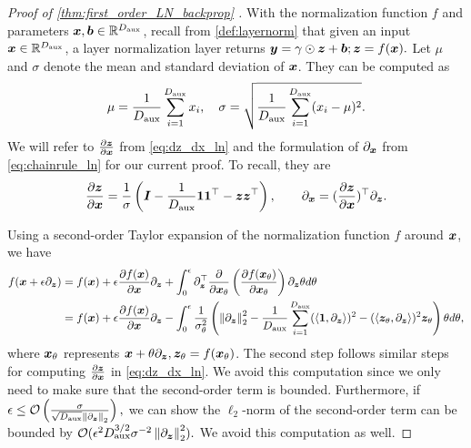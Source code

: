 \begin{proof}[ Proof of \cref{thm:first_order_LN_backprop} ]
With the normalization function $f$ and parameters ${\bm{x}}, {\bm{b}} \in \mathbb{R}^{ D_{\text{aux}}}$, recall from \cref{def:layernorm} that given an input ${\bm{x}} \in \mathbb{R}^{ D_{\text{aux}} }$, a layer normalization layer returns ${\bm{y}} = \gamma \odot {\bm{z}} + {\bm{b}}; {\bm{z}} = f({\bm{x}}).$  Let $\mu$ and $\sigma$ denote the mean and standard deviation of ${\bm{x}}$. They can be computed as 
\begin{align*}
    \mu = \frac{1}{ D_{\text{aux}} } \sum_{i=1}^{D_{\text{aux}}} x_i, \quad \sigma = \sqrt{ \frac{ 1 }{ D_{\text{aux}} } \sum_{i=1}^{D_{\text{aux}}} (x_i - \mu)^2  }.
\end{align*}
We will refer to $\frac{\partial {\bm{z}}}{\partial {\bm{x}}}$ from \cref{eq:dz_dx_ln} and the formulation of $\partial_{{\bm{x}}}$ from \cref{eq:chainrule_ln} for our current proof. To recall, they are
\begin{align*}
    \frac{\partial {\bm{z}}}{ \partial {\bm{x}}} =
     \frac{1}{\sigma} \left( {\bm{I}} - \frac{ 1 }{ D_{\text{aux}} } \mathbf{1} \mathbf{1}^{\top} - {\bm{z}} {\bm{z}}^{\top} \right), \qquad \partial_{{\bm{x}}} = (\frac{\partial {\bm{z}}}{ \partial {\bm{x}}})^{\top} \partial_{ {\bm{z}} }.
\end{align*}




Using a second-order Taylor expansion of the normalization function $f$ around ${\bm{x}}$, we have
\begin{align*}
    f( {\bm{x}} + \epsilon \partial_{ {\bm{z}} } ) &= f({\bm{x}}) + \epsilon  \frac{ \partial  f({\bm{x}}) }{ \partial {\bm{x}} }\partial_{ {\bm{z}} }  +  \int_{0}^{\epsilon}   \partial_{ {\bm{z}} }^{\top} \frac{\partial }{ \partial {\bm{x}}_{\theta} } \left( \frac{\partial  f({\bm{x}}_{\theta})}{ \partial {\bm{x}}_{\theta} } \right) \partial_{ {\bm{z}} } \theta d\theta \\&
    = f({\bm{x}}) + \epsilon  \frac{ \partial  f({\bm{x}}) }{ \partial {\bm{x}} }\partial_{ {\bm{z}} }  -    \int_{0}^{\epsilon}   \frac{1}{\sigma^2_{\theta}} \left( \left\| \partial_{ {\bm{z}} } \right\|_2^2 - \frac{1}{D_{\text{aux}}} \sum_{i=1}^{ D_{\text{aux}} } (\langle \mathbf{1}, \partial_{{\bm{z}}}  \rangle)^2 - ( \langle {\bm{z}}_{\theta}, \partial_{{\bm{z}}}  \rangle )^2 {\bm{z}}_{\theta}    \right) \theta d\theta,
\end{align*}
where ${\bm{x}}_{\theta}$ represents ${\bm{x}} + \theta \partial_{{\bm{z}}}, {\bm{z}}_{\theta} = f({\bm{x}}_{\theta})$. The second step follows similar steps for computing $  \frac{\partial {\bm{z}}}{ \partial {\bm{x}}} $ in \cref{eq:dz_dx_ln}. We avoid this computation since we only need to make sure that the second-order term is  bounded. Furthermore, if $\epsilon \le \mathcal{O}\left( \frac{\sigma}{ \sqrt{D_{\text{aux}}} \left\| \partial_{{\bm{z}}} \right\|_2 } \right), $ we can show the $\ell_2$-norm of the second-order term can be bounded by $\mathcal{O} ( \epsilon^2 D_{\text{aux}}^{3/2} \sigma^{-2} \left\| \partial_{{\bm{z}}} \right\|^2_2  ).$ We avoid this computation as well. 



\end{proof}
